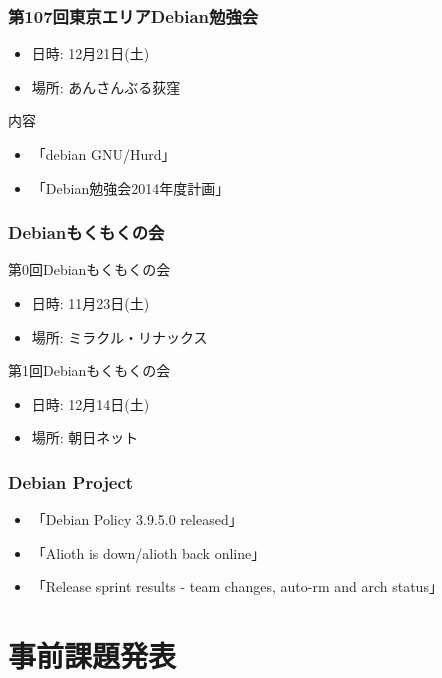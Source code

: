 \documentclass[cjk,dvipdfmx,10pt,compress,%
hyperref={bookmarks=true,bookmarksnumbered=true,bookmarksopen=false,%
colorlinks=false,%
pdftitle={第 79 回 関西 Debian 勉強会},%
pdfauthor={倉敷・のがた・佐々木・かわだ・八津尾},%
pdfsubject={資料},%
}]{beamer}
\begin{document}
\begin{frame}[fragile]
  \frametitle{第107回東京エリアDebian勉強会}
  \begin{itemize}
  \item 日時: 12月21日(土)
  \item 場所: あんさんぶる荻窪
  \end{itemize}
  \begin{block}{内容}
    \begin{itemize}
    \item 「debian GNU/Hurd」
    \item 「Debian勉強会2014年度計画」
    \end{itemize}
  \end{block}
\end{frame}

\begin{frame}[fragile]
  \frametitle{Debianもくもくの会}
  \begin{block}{第0回Debianもくもくの会}
    \begin{itemize}
    \item 日時: 11月23日(土)
    \item 場所: ミラクル・リナックス
    \end{itemize}
  \end{block}
  \begin{block}{第1回Debianもくもくの会}
    \begin{itemize}
    \item 日時: 12月14日(土)
    \item 場所: 朝日ネット
    \end{itemize}
  \end{block}
\end{frame}

\begin{frame}[fragile]
  \frametitle{Debian Project}
  \begin{itemize}
  \item 「Debian Policy 3.9.5.0 released」
  \item 「Alioth is down/alioth back online」
  \item 「Release sprint results - team changes, auto-rm and arch status」
  \end{itemize}
\end{frame}


\section{事前課題発表}
\end{document}
